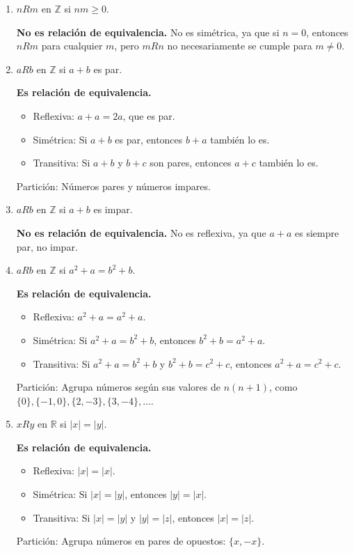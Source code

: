 \begin{solution}
    \begin{enumerate}
        \item \( n R m \) en \( \mathbb{Z} \) si \( nm \geq 0 \).

        \textbf{No es relación de equivalencia.} No es simétrica, ya que si \( n = 0 \), entonces \( nR m \) para cualquier \( m \), pero \( mR n \) no necesariamente se cumple para \( m \neq 0 \).
        \item \( a R b \) en \( \mathbb{Z} \) si \( a + b \) es par.
        
        \textbf{Es relación de equivalencia.}
          \begin{itemize}
                \item Reflexiva: \( a + a = 2a \), que es par.
                \item Simétrica: Si \( a + b \) es par, entonces \( b + a \) también lo es.
                \item Transitiva: Si \( a + b \) y \( b + c \) son pares, entonces \( a + c \) también lo es.
          \end{itemize}
        Partición: Números pares y números impares.   
        \item \( a R b \) en \( \mathbb{Z} \) si \( a + b \) es impar.
        
        \textbf{No es relación de equivalencia.} No es reflexiva, ya que \( a + a \) es siempre par, no impar.
        
        \item \( a R b \) en \( \mathbb{Z} \) si \( a^2 + a = b^2 + b \).

        \textbf{Es relación de equivalencia.}
          \begin{itemize}
            \item Reflexiva: \( a^2 + a = a^2 + a \).
            \item Simétrica: Si \( a^2 + a = b^2 + b \), entonces \( b^2 + b = a^2 + a \).
            \item Transitiva: Si \( a^2 + a = b^2 + b \) y \( b^2 + b = c^2 + c \), entonces \( a^2 + a = c^2 + c \).
          \end{itemize}
        Partición: Agrupa números según sus valores de \( n(n + 1) \), como \( \{0\}, \{-1, 0\}, \{2, -3\}, \{3, -4\}, \dots \).
        
        \item \( x R y \) en \( \mathbb{R} \) si \( |x| = |y| \).

        \textbf{Es relación de equivalencia.}
          \begin{itemize}
            \item Reflexiva: \( |x| = |x| \).
            \item Simétrica: Si \( |x| = |y| \), entonces \( |y| = |x| \).
            \item Transitiva: Si \( |x| = |y| \) y \( |y| = |z| \), entonces \( |x| = |z| \).
          \end{itemize}
        Partición: Agrupa números en pares de opuestos: \( \{x, -x\} \).
        

\end{enumerate}
\end{solution}
